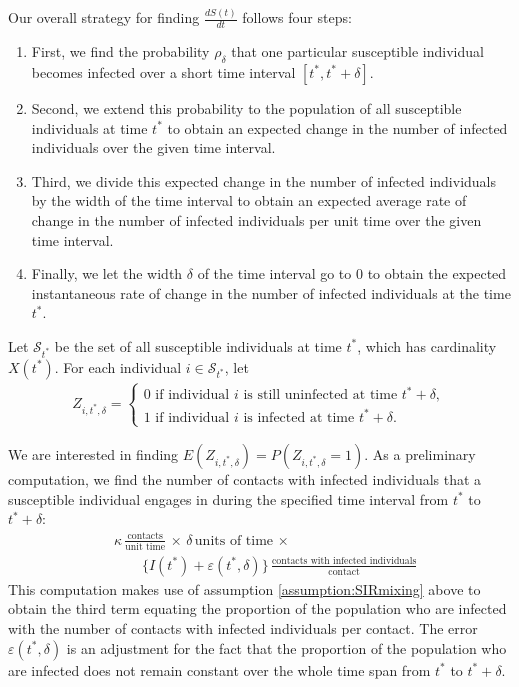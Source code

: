 \documentclass[fleqn]{article}\usepackage[]{graphicx}\usepackage[]{color}
\begin{document}
Our overall strategy for finding $\frac{d S(t)}{d t}$ follows four steps:
\begin{enumerate}
\item First, we find the probability $\rho_\delta$ that one particular susceptible individual becomes infected over a short time interval $[t^*, t^* + \delta]$.
\item Second, we extend this probability to the population of all susceptible individuals at time $t^*$ to obtain an expected change in the number of infected individuals over the given time interval.
\item Third, we divide this expected change in the number of infected individuals by the width of the time interval to obtain an expected average rate of change in the number of infected individuals per unit time over the given time interval.
\item Finally, we let the width $\delta$ of the time interval go to $0$ to obtain the expected instantaneous rate of change in the number of infected individuals at the time $t^*$.
\end{enumerate}

Let $\mathcal{S}_{t^*}$ be the set of all susceptible individuals at time $t^*$, which has cardinality $X(t^*)$.  For each individual $i \in \mathcal{S}_{t^*}$, let
\begin{align*}
Z_{i, t^*, \delta} = \begin{cases} 0 \text{ if individual $i$ is still uninfected at time $t^* + \delta$}, \\ 1 \text{ if individual $i$ is infected at time $t^* + \delta$.} \end{cases}
\end{align*}

We are interested in finding $E(Z_{i, t^*, \delta}) = P(Z_{i, t^*, \delta} = 1)$.  As a preliminary computation, we find the number of contacts with infected individuals that a susceptible individual engages in during the specified time interval from $t^*$ to $t^* + \delta$:
\begin{align*}
&\kappa \, \frac{\text{contacts}}{\text{unit time}} \, \times \, \delta \, \text{units of time} \, \times \\
&\qquad \{I(t^*) + \varepsilon(t^*, \delta)\} \, \frac{\text{contacts with infected individuals}}{\text{contact}}
\end{align*}
This computation makes use of assumption \ref{assumption:SIRmixing} above to obtain the third term equating the proportion of the population who are infected with the number of contacts with infected individuals per contact.  The error $\varepsilon(t^*, \delta)$ is an adjustment for the fact that the proportion of the population who are infected does not remain constant over the whole time span from $t^*$ to $t^* + \delta$.
\end{document}
